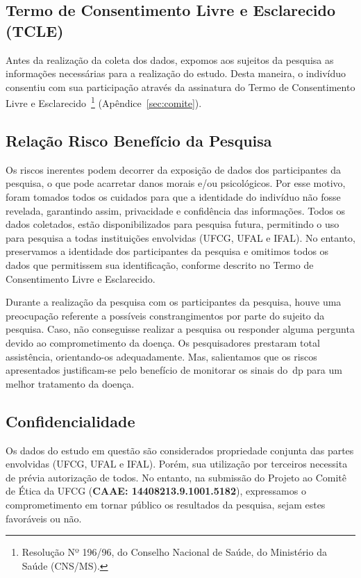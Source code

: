 \subsection{Termo de Consentimento Livre e Esclarecido (TCLE)}
Antes da realização da coleta dos dados, expomos aos sujeitos da pesquisa as informações necessárias para a realização do estudo. Desta maneira, o indivíduo consentiu com sua participação através da assinatura do Termo de Consentimento Livre e Esclarecido~\footnote{Resolução Nº 196/96, do Conselho Nacional de Saúde, do Ministério da Saúde (CNS/MS).} (Apêndice~\ref{sec:comite}). 

\subsection{Relação Risco Benefício da Pesquisa}
Os riscos inerentes podem decorrer da exposição de dados dos participantes da pesquisa, o que pode acarretar danos morais e/ou psicológicos. Por esse motivo, foram tomados todos os cuidados para que a identidade do indivíduo não fosse revelada, garantindo assim, privacidade e confidência das informações. Todos os dados coletados, estão disponibilizados para pesquisa futura, permitindo o uso para pesquisa a todas instituições envolvidas (UFCG, UFAL e IFAL). No entanto, preservamos a identidade dos participantes da pesquisa e omitimos todos os dados que permitissem sua identificação, conforme descrito no Termo de Consentimento Livre e Esclarecido.

Durante a realização da pesquisa com os participantes da pesquisa, houve uma preocupação referente a possíveis constrangimentos por parte do sujeito da pesquisa. Caso, não conseguisse realizar a pesquisa ou responder alguma pergunta devido ao comprometimento da doença. Os pesquisadores prestaram total assistência, orientando-os adequadamente. Mas, salientamos que os riscos apresentados justificam-se pelo benefício de monitorar os sinais do~\ac{dp} para um melhor tratamento da doença.


\subsection{Confidencialidade}
Os dados do estudo em questão são considerados propriedade conjunta das partes envolvidas (UFCG, UFAL e IFAL). Porém, sua utilização por terceiros necessita de prévia autorização de todos. No entanto, na submissão do Projeto ao Comitê de Ética da UFCG (\textbf{CAAE: 14408213.9.1001.5182}), expressamos o comprometimento em tornar público os resultados da pesquisa, sejam estes favoráveis ou não.


